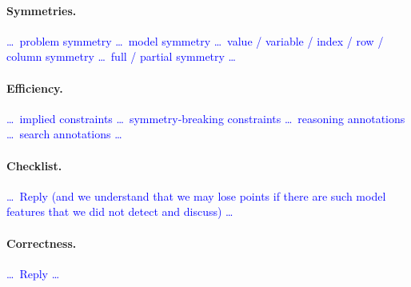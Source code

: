 \documentclass[a4paper,11pt,hidelinks]{article}
\renewcommand{\todo}[1]{\textcolor{blue}{#1}} %
\begin{document}
\paragraph{Symmetries.}
\todo{\dots\ problem symmetry \dots\ model symmetry \dots\ value /
  variable / index / row / column symmetry \dots\ full / partial
  symmetry \dots}

\paragraph{Efficiency.}
\todo{\dots\ implied constraints \dots\ symmetry-breaking constraints
  \dots\ reasoning annotations \dots\ search annotations \dots}

\paragraph{Checklist.}
\todo{\dots\ Reply (and we understand that we may lose points if there
  are such model features that we did not detect and discuss) \dots}

\paragraph{Correctness.}
\todo{\dots\ Reply \dots}
\end{document}
